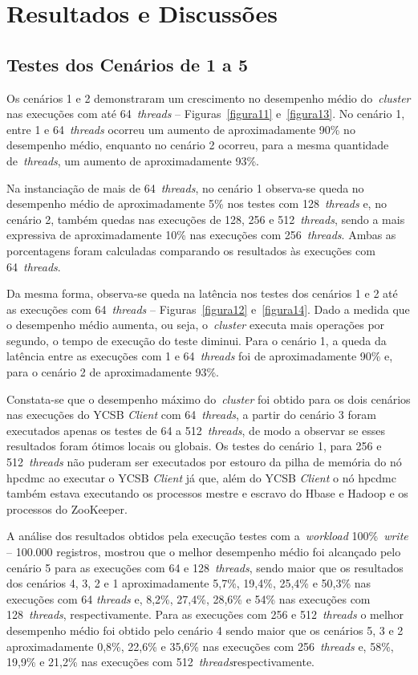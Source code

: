 \documentclass[12pt]{article}
\begin{document}
\section{Resultados e Discussões}
\label{sec:resultados}

\subsection{Testes dos Cenários de 1 a 5}

Os cenários 1 e 2 demonstraram um crescimento no desempenho médio do~\emph{cluster} nas execuções com até 64~\emph{threads} -- Figuras~\ref{figura11} e~\ref{figura13}. No cenário 1, entre 1 e 64~\emph{threads} ocorreu um aumento de aproximadamente 90\% no desempenho médio, enquanto no cenário 2 ocorreu, para a mesma quantidade de~\emph{threads}, um aumento de aproximadamente 93\%.

Na instanciação de mais de 64~\emph{threads}, no cenário 1 observa-se queda no desempenho médio de aproximadamente 5\% nos testes com 128~\emph{threads} e, no cenário 2, também quedas nas execuções de 128, 256 e 512~\emph{threads}, sendo a mais expressiva de aproximadamente 10\% nas execuções com 256~\emph{threads}. Ambas as porcentagens foram calculadas comparando os resultados às execuções com 64~\emph{threads}.

Da mesma forma, observa-se queda na latência nos testes dos cenários 1 e 2 até as execuções com 64~\emph{threads} -- Figuras~\ref{figura12} e~\ref{figura14}. Dado a medida que o desempenho médio aumenta, ou seja, o~\emph{cluster} executa mais operações por segundo, o tempo de execução do teste diminui. Para o cenário 1, a queda da latência entre as execuções com 1 e 64~\emph{threads} foi de aproximadamente 90\% e, para o cenário 2 de aproximadamente 93\%.

Constata-se que o desempenho máximo do~\emph{cluster} foi obtido para os dois cenários nas execuções do YCSB \textit{Client} com 64~\emph{threads}, a partir do cenário 3 foram executados apenas os testes de 64 a 512~\emph{threads}, de modo a observar se esses resultados foram ótimos locais ou globais. Os testes do cenário 1, para 256 e 512~\emph{threads} não puderam ser executados por estouro da pilha de memória do nó hpcdmc ao executar o YCSB \textit{Client} já que, além do YCSB \textit{Client} o nó hpcdmc também estava executando os processos mestre e escravo do Hbase e Hadoop e os processos do ZooKeeper.

A análise dos resultados obtidos pela execução testes com a~\emph{workload} 100\%~\emph{write} -- 100.000 registros, mostrou que o melhor desempenho médio foi alcançado pelo cenário 5 para as execuções com 64 e 128~\emph{threads}, sendo maior que os resultados dos cenários 4, 3, 2 e 1 aproximadamente 5,7\%, 19,4\%, 25,4\% e 50,3\% nas execuções com 64 \emph{threads} e, 8,2\%, 27,4\%, 28,6\% e 54\% nas execuções com 128~\emph{threads}, respectivamente. Para as execuções com 256 e 512~\emph{threads} o melhor desempenho médio foi obtido pelo cenário 4 sendo maior que os cenários 5, 3 e 2 aproximadamente 0,8\%, 22,6\% e 35,6\% nas execuções com 256~\emph{threads} e, 58\%, 19,9\% e 21,2\% nas execuções com 512~\emph{threads}respectivamente.
\end{document}
